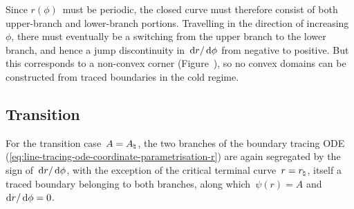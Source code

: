 Since $r (\phi)$~must be periodic,
the closed curve must therefore consist of both
upper-branch and lower-branch portions.
Travelling in the direction of increasing~$\phi$,
there must eventually be a switching
from the upper branch to the lower branch,
and hence a jump discontinuity in~$\mathop{}\!\mathrm{d} r / \mathop{}\!\mathrm{d}\phi$
from negative to positive.
But this corresponds to a non-convex corner
(Figure~\tbd),
so no convex domains can be constructed from traced boundaries
in the cold regime.

\subsection{Transition}
\label{sec:polar.tracing.transition}

For the transition case~$A = A_\natural$,
the two branches of the boundary tracing ODE~%
  (\ref{eq:line-tracing-ode-coordinate-parametrisation-r})
are again segregated by the sign of~$\mathop{}\!\mathrm{d} r / \mathop{}\!\mathrm{d}\phi$,
with the exception of the critical terminal curve~$r = r_\natural$,
itself a traced boundary belonging to both branches,
along which~$\psi (r) = A$ and~$\mathop{}\!\mathrm{d} r / \mathop{}\!\mathrm{d}\phi = 0$.

